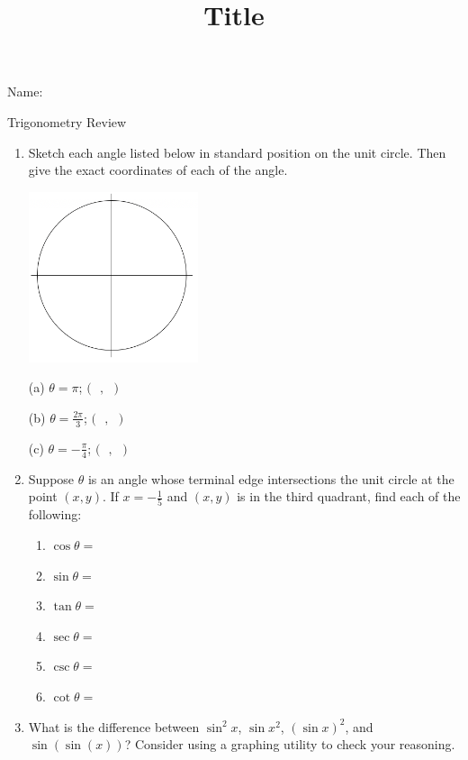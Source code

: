 \documentclass[12pt]{article}
\title{Title}
\begin{document}

Name:
 \begin{center}\large{Trigonometry Review}\end{center}
\begin{enumerate}
\item Sketch each angle listed below in standard position on the unit circle. Then give the exact coordinates of each of the angle.\\
\noindent\begin{minipage}{0.3\textwidth}%
\includegraphics [height=50mm, width=50mm]{Trig_Blank_Unit}
\end{minipage}%
\hspace{40mm}
\begin{minipage}{0.6\textwidth}
(a) $\theta = \pi$; $\big(~~~,~~~\big)$\\

\vspace{5mm}

(b) $\theta = \frac{2\pi}{3}$; $\big(~~~,~~~\big)$\\

\vspace{5mm}

(c) $\theta =- \frac{\pi}{4}$; $\big(~~~,~~~\big)$\\


\end{minipage}

\item Suppose $\theta$ is an angle whose terminal edge intersections the unit circle at the point $(x,y)$. If $x=-\frac{1}{5}$ and $(x,y)$ is in the third quadrant, find each of the following:\\
\begin{multicols}{3}
\begin{enumerate}[itemsep=2cm]
\item $\cos \theta = $
\item $\sin \theta = $
\item $\tan \theta = $
\item $\sec \theta = $
\item $\csc \theta = $
\item $\cot \theta = $
\end{enumerate}
\end{multicols}
\vspace{20mm}
\item What is the difference between $\sin^2 x$, $\sin x^2$, $(\sin x)^2$, and $\sin(\sin(x))$? Consider using a graphing utility to check your reasoning.


\end{enumerate}
\end{document}

